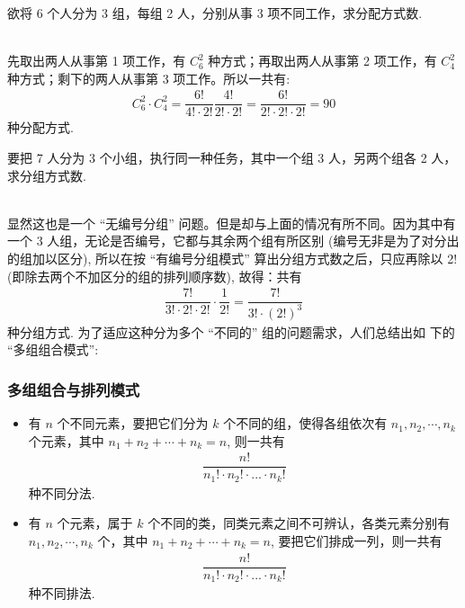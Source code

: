 \documentclass[Prob-All.tex]{subfiles}
\begin{document}
	\begin{frame}
		\begin{exam}
			欲将 6 个人分为 3 组，每组 2 人，分别从事 3 项不同工作，求分配方式数.
		\end{exam}\\
		\pause
		\jieda 先取出两人从事第 1 项工作，有 $C_6^2$ 种方式；再取出两人从事第 2 项工作，有 $C_4^2$ 种方式；剩下的两人从事第 3 项工作。所以一共有:\pause
		\begin{eqnarray*}
			C_6^2\cdot C_4^2= \dfrac{6!}{4!\cdot 2!}\dfrac{4!}{2!\cdot 2!}  = \dfrac{6!}{2! · 2! · 2!}=90
		\end{eqnarray*}
		种分配方式.
	\end{frame}


	\begin{frame}
		\begin{exam}
			要把 7 人分为 3 个小组，执行同一种任务，其中一个组 3 人，另两个组各 2 人，求分组方式数.
		\end{exam}\\

		\pause
		\jieda 显然这也是一个 “无编号分组” 问题。但是却与上面的情况有所不同。因为其中有一个 3 人组，无论是否编号，它都与其余两个组有所区别 (编号无非是为了对分出的组加以区分), 所以在按 “有编号分组模式” 算出分组方式数之后，只应再除以 2! (即除去两个不加区分的组的排列顺序数), \pause 故得：共有
		\begin{eqnarray*}
			\dfrac{7!}{3!\cdot 2! \cdot 2!}\cdot \dfrac{1}{2!}=\dfrac{7!}{ 3! \cdot (2!)^3}
		\end{eqnarray*}
		种分组方式.
		为了适应这种分为多个 “不同的” 组的问题需求，人们总结出如
		下的 “多组组合模式”:
	\end{frame}

	\begin{frame}
		\frametitle{多组组合与排列模式}

		\begin{itemize}[<+-|alert@+>]
			\item {} 有 $n$ 个不同元素，要把它们分为 $k$ 个不同的组，使得各组依次有 $n_1, n_2,\cdots, n_k$ 个元素，其中 $n_1+n_2+\cdots+n_k = n$, 则一共有
			\begin{eqnarray*}
				\dfrac{n!}{n_1! \cdot  n_2! \cdot ... \cdot  n_k!}
			\end{eqnarray*}
			种不同分法.

			\item {} 有 $n$ 个元素，属于 $k$ 个不同的类，同类元素之间不可辨认，各类元素分别有 $n_1, n_2, \cdots, n_k$ 个，其中 $n_1 +n_2 +\cdots+n_k = n$, 要把它们排成一列，则一共有
			\begin{eqnarray*}
				\dfrac{n!}{n_1! \cdot  n_2! \cdot ... \cdot  n_k!}
			\end{eqnarray*} 种不同排法.
		\end{itemize}
	\end{frame}
\end{document}
